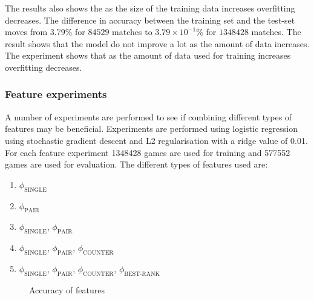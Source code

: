 The results also shows the as the size of the training data increases overfitting decreases. The difference in accuracy between the training set and the test-set moves from $3.79\%$ for $84529$ matches to $3.79\times10^{-1} \%$ for $1348428$ matches. The result shows that the model do not improve a lot as the amount of data increases. The experiment shows that as the amount of data used for training increases overfitting decreases.      


\subsubsection{Feature experiments}\label{sec:feattest}
A number of experiments are performed to see if combining different types of features may be beneficial.
Experiments are performed using logistic regression using stochastic gradient descent and L2 regularisation with a ridge value of 0.01. 
For each feature experiment 1348428 games are used for training and 577552 games are used for evaluation. 
The different types of features used are:
\begin{enumerate}
\item $\phi_\text{SINGLE}$
\item $\phi_\text{PAIR}$
\item $\phi_\text{SINGLE}$, $\phi_\text{PAIR}$
\item $\phi_\text{SINGLE}$, $\phi_\text{PAIR}$, $\phi_\text{COUNTER}$
\item $\phi_\text{SINGLE}$, $\phi_\text{PAIR}$, $\phi_\text{COUNTER}$, $\phi_\text{BEST-RANK}$
\end{enumerate}

\begin{figure}[!htb]
  \centering
   \caption{Accuracy of features}\label{fig:cluster-feat}
\end{figure}


